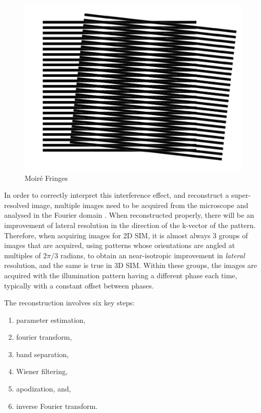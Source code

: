 \documentclass[12pt]{article}
\begin{document}
\begin{figure}[hbtp]
    \includegraphics[scale=0.5]{figures/moire.png}
    \caption{Moir\'{e} Fringes}
    \label{fig:moire}
\end{figure}

In order to correctly interpret this interference effect, and reconstruct a super-resolved image,
multiple images need to be acquired from the microscope and analysed in the Fourier domain \cite{originalSIM}.
When reconstructed properly, there will be an improvement of lateral resolution in the direction of the k-vector of the pattern.
Therefore, when acquiring images for 2D SIM, it is almost always 3 groups of images that are acquired,
using patterns whose orientations are angled at multiples of $2\pi/3$ radians,
to obtain an near-isotropic improvement in \textit{lateral} resolution,
and the same is true in 3D SIM.
Within these groups, the images are acquired with the illumination pattern having a different phase each time,
typically with a constant offset between phases.

The reconstruction involves six key steps:

\begin{enumerate}
    \item parameter estimation,
    \item fourier transform,
    \item band separation,
    \item Wiener filtering,
    \item apodization, and,
    \item inverse Fourier transform.
\end{enumerate}
\end{document}
